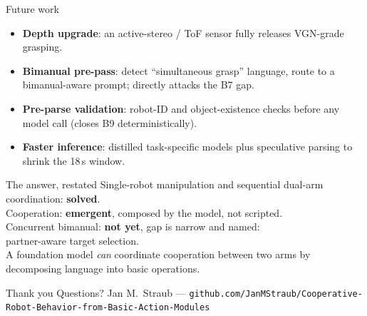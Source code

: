 \documentclass[aspectratio=169,11pt]{beamer}
\begin{document}
\begin{frame}{Future work}
	\begin{itemize}
		\item \textbf{Depth upgrade}: an active-stereo / ToF sensor fully releases VGN-grade grasping.
		\item \textbf{Bimanual pre-pass}: detect ``simultaneous grasp'' language, route to a
		      bimanual-aware prompt; directly attacks the B7 gap.
		\item \textbf{Pre-parse validation}: robot-ID and object-existence checks before any
		      model call (closes B9 deterministically).
		\item \textbf{Faster inference}: distilled task-specific models plus speculative parsing to
		      shrink the 18\,s window.
	\end{itemize}
\end{frame}

\begin{frame}[standout]{The answer, restated}
	Single-robot manipulation and sequential dual-arm coordination: \textbf{solved}.\\[0.5em]
	Cooperation: \textbf{emergent}, composed by the model, not scripted.\\[0.5em]
	Concurrent bimanual: \textbf{not yet}, gap is narrow and named:\\
	\alert{partner-aware target selection}.\\[0.8em]
	\footnotesize A foundation model \emph{can} coordinate cooperation between two arms
	by decomposing language into basic operations.
\end{frame}

\begin{frame}[standout]{Thank you}
	\centering
	Questions?
	\vfill
	\footnotesize Jan M.\ Straub --- \texttt{github.com/JanMStraub/Cooperative-Robot-Behavior-from-Basic-Action-Modules}
\end{frame}
\end{document}
